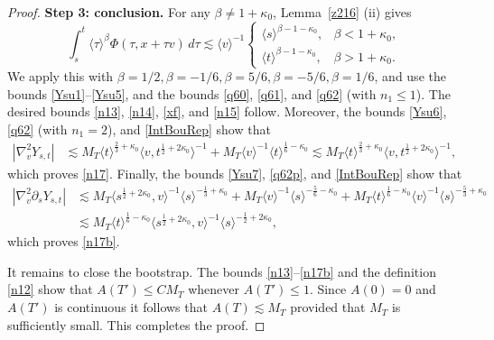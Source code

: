 \documentclass[reqno,11pt]{amsart}
\numberwithin{equation}{section}
\begin{document}
\begin{proof}
	
	\textbf{Step 3: conclusion.}
	For any $\beta\neq1+\kappa_0$, Lemma~\ref{z216} (ii) gives
	\begin{equation}\label{IntBouRep}
		\int_s^t
		\langle\tau\rangle^\beta
		\Phi(\tau,x+\tau v)\,d\tau
		\lesssim
		\langle v\rangle^{-1}
		\begin{cases}
			\langle s\rangle^{\beta-1-\kappa_0},
			&\beta<1+\kappa_0,\\
			\langle t\rangle^{\beta-1-\kappa_0},
			&\beta>1+\kappa_0.
		\end{cases}
	\end{equation}
	We apply this with $\beta=1/2, \beta=-1/6, \beta=5/6, \beta=-5/6, \beta=1/6$, and use the bounds \eqref{Ysu1}--\eqref{Ysu5}, and the bounds \eqref{q60}, \eqref{q61}, and \eqref{q62} (with $n_1\leq 1$). The desired bounds \eqref{n13}, \eqref{n14}, \eqref{xf}, and \eqref{n15} follow. Moreover, the bounds \eqref{Ysu6}, \eqref{q62} (with $n_1=2$), and \eqref{IntBouRep} show that
	\begin{align*}
		|\nabla_v^2Y_{s,t}|&\lesssim
		M_T\langle t\rangle^{\frac23+\kappa_0}
		\langle v,t^{\frac12+2\kappa_0}\rangle^{-1}+M_T\langle v\rangle^{-1}
		\langle t\rangle^{\frac16-\kappa_0}\lesssim
		M_T\langle t\rangle^{\frac23+\kappa_0}
		\langle v,t^{\frac12+2\kappa_0}\rangle^{-1},
	\end{align*}
	which proves \eqref{n17}. Finally, the bounds \eqref{Ysu7}, \eqref{q62p}, and \eqref{IntBouRep} show that
	\begin{align*}
		|\nabla_v^2\partial_sY_{s,t}|&\lesssim M_T\langle s^{\frac12+2\kappa_0},v\rangle^{-1}
		\langle s\rangle^{-\frac13+\kappa_0}+M_T\langle v\rangle^{-1}
		\langle s\rangle^{-\frac56-\kappa_0}+ M_T\langle t\rangle^{\frac16-\kappa_0}\langle v\rangle^{-1}\langle s\rangle^{-\frac53+\kappa_0}\\
		&\lesssim
		M_T\langle t\rangle^{\frac16-\kappa_0}
		\langle s^{\frac12+2\kappa_0},v\rangle^{-1}
		\langle s\rangle^{-\frac12+2\kappa_0},
	\end{align*}
	which proves \eqref{n17b}.
	
	It remains to close the bootstrap. The bounds \eqref{n13}--\eqref{n17b} and the definition \eqref{n12} show that \(A(T')\leq C M_T\) whenever \(A(T')\leq1\). Since $A(0)=0$ and $A(T')$ is continuous it follows that $A(T)\lesssim M_T$ provided that $M_T$ is sufficiently small. This completes the proof.
\end{proof}
	
\end{document}
